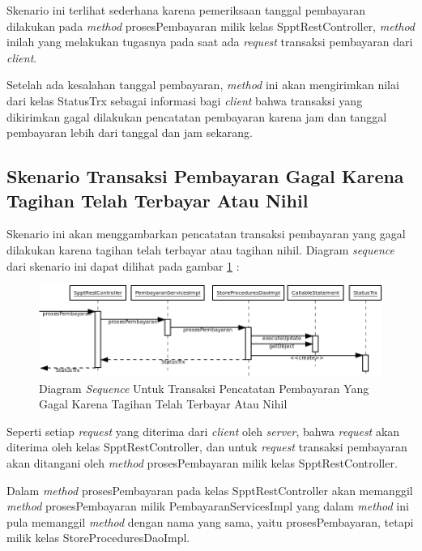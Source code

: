 Skenario ini terlihat sederhana karena pemeriksaan tanggal pembayaran dilakukan pada \textit{method} prosesPembayaran milik kelas SpptRestController, \textit{method} inilah yang melakukan tugasnya pada saat ada \textit{request} transaksi pembayaran dari \textit{client}.

Setelah ada kesalahan tanggal pembayaran, \textit{method} ini akan mengirimkan nilai dari kelas StatusTrx sebagai informasi bagi \textit{client} bahwa transaksi yang dikirimkan gagal dilakukan pencatatan pembayaran karena jam dan tanggal pembayaran lebih dari tanggal dan jam sekarang.

\subsection{Skenario Transaksi Pembayaran Gagal Karena Tagihan Telah Terbayar Atau Nihil}

Skenario ini akan menggambarkan pencatatan transaksi pembayaran yang gagal dilakukan karena tagihan telah terbayar atau tagihan nihil. Diagram \textit{sequence} dari skenario ini dapat dilihat pada gambar \ref{fig:uml-seq-trx-nihil} :

\begin{figure}[H]
  \centering
  \includegraphics[width=1\textwidth]{./resources/uml/uml-seq-trx-nihil}
  \caption{Diagram \textit{Sequence} Untuk Transaksi Pencatatan Pembayaran Yang Gagal Karena Tagihan Telah Terbayar Atau Nihil}
  \label{fig:uml-seq-trx-nihil}
\end{figure}

Seperti setiap \textit{request} yang diterima dari \textit{client} oleh \textit{server}, bahwa \textit{request} akan diterima oleh kelas SpptRestController, dan untuk \textit{request} transaksi pembayaran akan ditangani oleh \textit{method} prosesPembayaran milik kelas SpptRestController.

Dalam \textit{method} prosesPembayaran pada kelas SpptRestController akan memanggil \textit{method} prosesPembayaran milik PembayaranServicesImpl yang dalam \textit{method} ini pula memanggil \textit{method} dengan nama yang sama, yaitu prosesPembayaran, tetapi milik kelas StoreProceduresDaoImpl.

